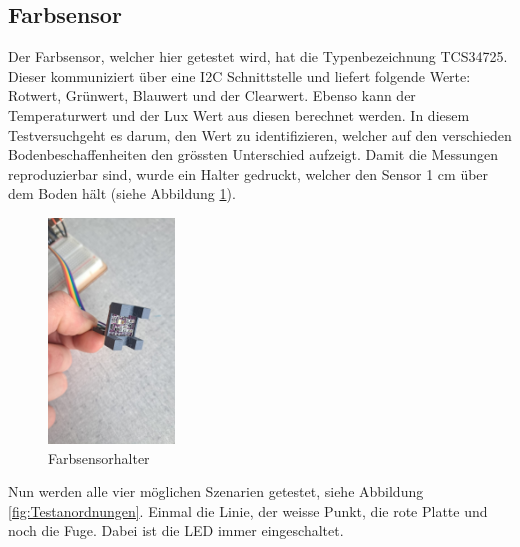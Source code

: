 \subsection{Farbsensor}
Der Farbsensor, welcher hier getestet wird, hat die Typenbezeichnung TCS34725. Dieser kommuniziert über eine I2C Schnittstelle und liefert folgende Werte: Rotwert, Grünwert, Blauwert und der Clearwert. Ebenso kann der Temperaturwert und der Lux Wert aus diesen berechnet werden. In diesem Testversuchgeht es darum, den Wert zu identifizieren, welcher auf den verschieden Bodenbeschaffenheiten den grössten Unterschied aufzeigt. Damit die Messungen reproduzierbar sind, wurde ein Halter gedruckt, welcher den Sensor 1 cm über dem Boden hält (siehe Abbildung \ref{fig:Farbsensorhalter}).


\begin{figure}[H] %
    \centering
    \includegraphics[width=0.3\textwidth]{img/sensortest/FarbsensorHalter.jpg} %
    \caption{Farbsensorhalter}
    \label{fig:Farbsensorhalter} %
\end{figure}

Nun werden alle vier möglichen Szenarien getestet, siehe Abbildung \ref{fig:Testanordnungen}. Einmal die Linie, der weisse Punkt, die rote Platte und noch die Fuge. Dabei ist die LED immer eingeschaltet.

